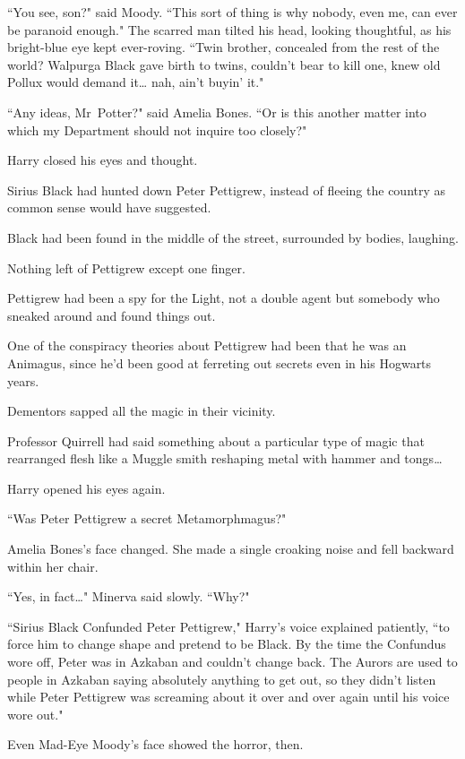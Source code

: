 ``You see, son?" said Moody. ``This sort of thing is why nobody, even me, can ever be paranoid enough." The scarred man tilted his head, looking thoughtful, as his bright-blue eye kept ever-roving. ``Twin brother, concealed from the rest of the world? Walpurga Black gave birth to twins, couldn't bear to kill one, knew old Pollux would demand it{\ldots} nah, ain't buyin' it."

``Any ideas, Mr~Potter?" said Amelia Bones. ``Or is this another matter into which my Department should not inquire too closely?"

Harry closed his eyes and thought.

Sirius Black had hunted down Peter Pettigrew, instead of fleeing the country as common sense would have suggested.

Black had been found in the middle of the street, surrounded by bodies, laughing.

Nothing left of Pettigrew except one finger.

Pettigrew had been a spy for the Light, not a double agent but somebody who sneaked around and found things out.

One of the conspiracy theories about Pettigrew had been that he was an Animagus, since he'd been good at ferreting out secrets even in his Hogwarts years.

Dementors sapped all the magic in their vicinity.

Professor Quirrell had said something about a particular type of magic that rearranged flesh like a Muggle smith reshaping metal with hammer and tongs{\ldots}

Harry opened his eyes again.

``Was Peter Pettigrew a secret Metamorphmagus?"

Amelia Bones's face changed. She made a single croaking noise and fell backward within her chair.

``Yes, in fact{\ldots}" Minerva said slowly. ``Why?"

``Sirius Black Confunded Peter Pettigrew," Harry's voice explained patiently, ``to force him to change shape and pretend to be Black. By the time the Confundus wore off, Peter was in Azkaban and couldn't change back. The Aurors are used to people in Azkaban saying absolutely anything to get out, so they didn't listen while Peter Pettigrew was screaming about it over and over again until his voice wore out."

Even Mad-Eye Moody's face showed the horror, then.

